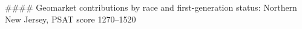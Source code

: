 #### Geomarket contributions by race and first-generation status: Northern New Jersey, PSAT score 1270–1520

